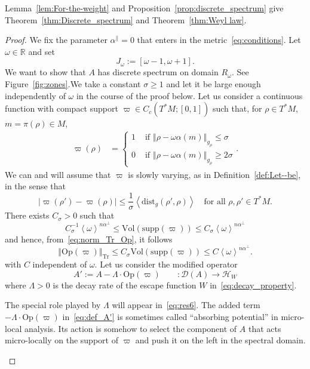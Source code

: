 \documentclass[10pt]{amsart}
\theoremstyle{definition}\newtheorem{defi}[theo]{Definition}\newtheorem{rema}[theo]{Remark}\newtheorem{exam}[theo]{Example}\newtheorem{exem}[theo]{Example}\newtheorem{nota}[theo]{Notation}
\newcommand{\clH}{\mathcal{H}}
\newcommand{\clD}{\mathcal{D}}
\newcommand{\dist}{\mathrm{dist}}
\newcommand{\Voll}{\mathrm{Vol}}
\newcommand{\supp}{\mathrm{supp}}
\newcommand{\Opp}{\mathrm{Op}}
\newcommand{\Tr}{\mathrm{Tr}}
\newcommand{\bbR}{\mathbb{R}}
\begin{document}
Lemma~\ref{lem:For-the-weight} and Proposition~\ref{prop:discrete_spectrum} give Theorem~\ref{thm:Discrete_spectrum} and Theorem~\ref{thm:Weyl law}.
\begin{proof}
We fix the parameter $\alpha^{\parallel}=0$ that enters in the metric~\eqref{eq:conditions}. Let $\omega\in\bbR$ and set
\begin{equation}\label{eq:def_J_omega}
J_{\omega}:=\left[\omega-1,\omega+1\right].
\end{equation}
We want to show that $A$ has discrete spectrum on domain $R_{\omega}$. See Figure~\ref{fig:zones}.\linebreak We take a constant $\sigma\geq1$ and let it be large enough independently of $\omega$ in the course of the proof below. Let us consider a continuous function with compact support $\varpi\in C_{c}(T^{*}M;[0,1])$ such that, for $\rho\in T^{*}M$, $m=\pi(\rho)\in M$,
\begin{align}\label{eq:def_Omega_0'}
\varpi\left(\rho\right) & =
\begin{cases}
1 & \text{ if }\left\Vert \rho-\omega\alpha\left(m\right)\right\Vert _{g_{\rho}}\leq\sigma\\
0 & \text{ if }\left\Vert \rho-\omega\alpha\left(m\right)\right\Vert _{g_{\rho}}\geq2\sigma
\end{cases}.
\end{align}
We can and will assume that $\varpi$ is slowly varying, as in Definition~\ref{def:Let--be}, in the sense that
\begin{equation}\label{eq:slow_variation_varpi}
\left|\varpi\left(\rho'\right)-\varpi\left(\rho\right)\right|\leq\frac{1}{\sigma}\left\langle \dist_{g}\left(\rho',\rho\right)\right\rangle \quad\text{for all }\rho,\rho'\in T^{*}M.
\end{equation}
There exists $C_{\sigma}>0$ such that
\[
C_{\sigma}^{-1}\left\langle \omega\right\rangle ^{n\alpha^{\perp}}\le\Voll\left(\supp\left(\varpi\right)\right)\le C_{\sigma}\left\langle \omega\right\rangle ^{n\alpha^{\perp}}
\]
and hence, from~\eqref{eq:norm_Tr_Op}, it follows
\begin{equation}\label{eq:trace_Omega_0}
\left\Vert \Opp \left(\varpi\right)\right\Vert _{\Tr}\leq C_{\sigma}\Voll\left(\supp\left(\varpi\right)\right)\leq C\left\langle \omega\right\rangle ^{n\alpha^{\perp}}.
\end{equation}
with $C$ independent of $\omega$. Let us consider the modified operator
\begin{equation}\label{eq:def_A'}
A':=A-\Lambda\cdot\Opp \left(\varpi\right)\qquad:\clD\left(A\right)\rightarrow\clH _{W}
\end{equation}
where $\Lambda>0$ is the decay rate of the escape function $W$ in~\eqref{eq:decay_property}.
\begin{rem}
The special role played by $\Lambda$ will appear in~\eqref{eq:res6}. The added term $-\Lambda\cdot\Opp (\varpi)$ in~\eqref{eq:def_A'} is sometimes called ``absorbing potential'' in micro-local analysis. Its action is somehow to select the component of $A$ that acts micro-locally on the support of $\varpi$ and push it on the left in the spectral domain.
\end{rem}


\end{proof}
\end{document}
